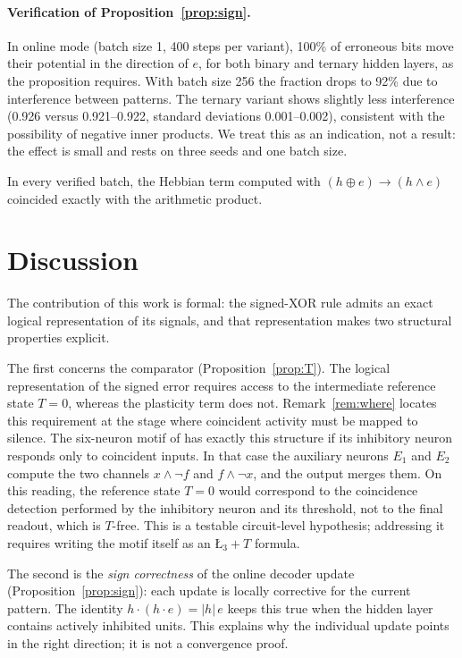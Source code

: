 \documentclass[11pt,a4paper]{article}
\theoremstyle{remark}
\newcommand{\LtT}{\text{\L}_3{+}T}
\begin{document}
\paragraph{Verification of Proposition~\ref{prop:sign}.} In online mode (batch size 1, 400 steps per variant), 100\% of erroneous bits move their potential in the direction of $e$, for both binary and ternary hidden layers, as the proposition requires. With batch size 256 the fraction drops to 92\% due to interference between patterns. The ternary variant shows slightly less interference (0.926 versus 0.921--0.922, standard deviations 0.001--0.002), consistent with the possibility of negative inner products. We treat this as an indication, not a result: the effect is small and rests on three seeds and one batch size.

In every verified batch, the Hebbian term computed with $(h\oplus e)\to(h\wedge e)$ coincided exactly with the arithmetic product.

\section{Discussion}

The contribution of this work is formal: the signed-XOR rule admits an exact logical representation of its signals, and that representation makes two structural properties explicit.

The first concerns the comparator (Proposition~\ref{prop:T}). The logical representation of the signed error requires access to the intermediate reference state $T=0$, whereas the plasticity term does not. Remark~\ref{rem:where} locates this requirement at the stage where coincident activity must be mapped to silence. The six-neuron motif of \cite{pena2024,pena2026} has exactly this structure if its inhibitory neuron responds only to coincident inputs. In that case the auxiliary neurons $E_1$ and $E_2$ compute the two channels $x\land\neg f$ and $f\land\neg x$, and the output merges them. On this reading, the reference state $T=0$ would correspond to the coincidence detection performed by the inhibitory neuron and its threshold, not to the final readout, which is $T$-free. This is a testable circuit-level hypothesis; addressing it requires writing the motif itself as an $\LtT$ formula.

The second is the \emph{sign correctness} of the online decoder update (Proposition~\ref{prop:sign}): each update is locally corrective for the current pattern. The identity $h\cdot(h\cdot e)=|h|\,e$ keeps this true when the hidden layer contains actively inhibited units. This explains why the individual update points in the right direction; it is not a convergence proof.
\end{document}
